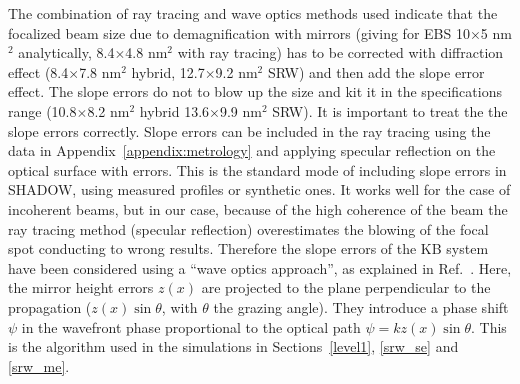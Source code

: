 \documentclass{iucr}              %
\begin{document}
The combination of ray tracing and wave optics methods used indicate that the focalized beam size due to  demagnification with mirrors (giving for EBS 10$\times$5 nm$^2$ analytically, 8.4$\times$4.8 nm$^2$ with ray tracing) has to be corrected with diffraction effect (8.4$\times$7.8 nm$^2$ hybrid, 12.7$\times$9.2 nm$^2$ SRW) and then add the slope error effect. The slope errors do not to blow up the size and kit it in the specifications range (10.8$\times$8.2 nm$^2$ hybrid 13.6$\times$9.9 nm$^2$ SRW). It is important to treat the the slope errors correctly. Slope errors can be included in the ray tracing using the data in Appendix~\ref{appendix:metrology} and applying specular reflection on the optical surface with errors. This is the standard mode of including slope errors in SHADOW, using measured profiles or synthetic ones. It works well for the case of incoherent beams, but in our case, because of the high coherence of the beam the ray tracing method (specular reflection) overestimates the blowing of the focal spot conducting to wrong results. Therefore the slope errors of the KB system have been considered using a ``wave optics approach'', as explained in Ref.~\cite{hybrid}. Here, the mirror height errors $z(x)$ are projected to the plane perpendicular to the propagation ($z(x) \sin \theta$, with $\theta$ the grazing angle). They introduce a phase shift $\psi$ in the wavefront phase proportional to the optical path $\psi = k z(x) \sin \theta $. This is the algorithm used in the simulations in Sections~\ref{level1}, \ref{srw_se} and \ref{srw_me}.   


\end{document}
